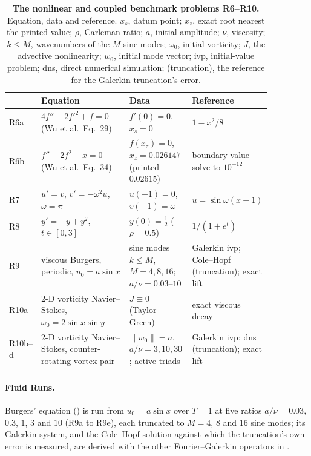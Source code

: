 \begin{table}[!htbp]
    \centering
    \caption[The nonlinear and coupled benchmark problems R6--R10]{\textbf{The nonlinear and coupled benchmark problems R6--R10.} Equation, data and reference. $x_s$, datum point; $x_z$, exact root nearest the printed value; $\rho$, Carleman ratio; $a$, initial amplitude; $\nu$, viscosity; $k\le M$, wavenumbers of the $M$ sine modes; $\omega_0$, initial vorticity; $J$, the advective nonlinearity; $w_0$, initial mode vector; \gls{ivp}, initial-value problem; \gls{dns}, direct numerical simulation; (truncation), the reference for the Galerkin truncation's error.}
    \label{tab:catalogue-nonlinear}
    \small
    \begin{tabular}{@{}l p{0.34\linewidth} p{0.24\linewidth} p{0.28\linewidth}@{}}
        \toprule
        & Equation & Data & Reference \\
        \midrule
        R6a & $4f'' + 2f'^2 + f = 0$ (Wu et al.\ Eq.~29) & $f'(0) = 0$, $x_s = 0$ & $1 - x^2/8$ \\
        R6b & $f'' - 2f^2 + x = 0$ (Wu et al.\ Eq.~34) & $f(x_z) = 0$, $x_z = 0.026147$ (printed $0.02615$) & boundary-value solve to $10^{-12}$ \\
        R7  & $u' = v$, $v' = -\omega^2 u$, $\omega = \pi$ & $u(-1) = 0$, $v(-1) = \omega$ & $u = \sin\omega(x+1)$ \\
        R8  & $y' = -y + y^2$, $t \in [0, 3]$ & $y(0) = \tfrac12$ ($\rho = 0.5$) & $1/(1 + e^{t})$ \\
        R9  & viscous Burgers, periodic, $u_0 = a\sin x$ & sine modes $k \le M$, $M = 4, 8, 16$; $a/\nu = 0.03$--$10$ & Galerkin \gls{ivp}; Cole--Hopf (truncation); exact lift \\
        R10a & 2-D vorticity Navier--Stokes, $\omega_0 = 2\sin x\sin y$ & $J \equiv 0$ (Taylor--Green) & exact viscous decay \\
        R10b--d & 2-D vorticity Navier--Stokes, counter-rotating vortex pair & $\|w_0\| = a$, $a/\nu = 3, 10, 30$; active triads & Galerkin \gls{ivp}; \gls{dns} (truncation); exact lift \\
        \bottomrule
    \end{tabular}
\end{table}

\paragraph{Fluid Runs.}
\label{app:fluid-data}
Burgers' equation () is run from $u_0=a\sin x$ over $T=1$ at five ratios $a/\nu=0.03$, $0.3$, $1$, $3$ and $10$ (R9a to R9e), each truncated to $M=4$, $8$ and $16$ sine modes; its Galerkin system, and the Cole--Hopf solution against which the truncation's own error is measured, are derived with the other Fourier--Galerkin operators in .

